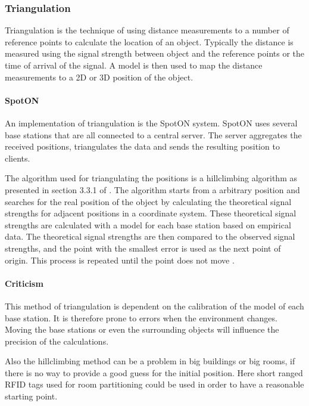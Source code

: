 \subsubsection{Triangulation}\label{triangulation}
Triangulation is the technique of using distance measurements to a number of reference points to calculate the location of an object.
Typically the distance is measured using the signal strength between object and the reference points or the time of arrival of the signal.
A model is then used to map the distance measurements to a 2D or 3D position of the object.\cite[Section 4.1]{rfidreview}

\paragraph{SpotON}
An implementation of triangulation is the SpotON system\cite{spoton}.
SpotON uses several base stations that are all connected to a central server.
The server aggregates the received positions, triangulates the data and sends the resulting position to clients. \cite{spoton}

The algorithm used for triangulating the positions is a hillclimbing algorithm as presented in section 3.3.1 of \citet{spoton}.
The algorithm starts from a arbitrary position and searches for the real position of the object by calculating the theoretical signal strengths for adjacent positions in a coordinate system.
These theoretical signal strengths are calculated with a model for each base station based on empirical data.
The theoretical signal strengths are then compared to the observed signal strengths, and the point with the smallest error is used as the next point of origin.
This process is repeated until the point does not move \cite{spoton}.

\paragraph{Criticism}
This method of triangulation is dependent on the calibration of the model of each base station.
It is therefore prone to errors when the environment changes.
Moving the base stations or even the surrounding objects will influence the precision of the calculations.

Also the hillclimbing method can be a problem in big buildings or big rooms, if there is no way to provide a good guess for the initial position.
Here short ranged RFID tags used for room partitioning could be used in order to have a reasonable starting point.


